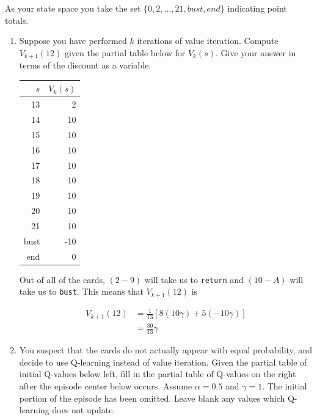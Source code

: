 \documentclass[12pt]{article}
\begin{document}
\noindent
As your state space you take the set $\{0,2,\ldots,21,bust,end\}$
indicating point totals.

\begin{enumerate}

\item Suppose you have performed $k$ iterations of value iteration.
  Compute $V_{k+1}(12)$ given the partial table below for $V_k(s)$.
  Give your answer in terms of the discount as a variable.

\begin{center}
\begin{tabular}{|r|r|} \hline
$s$  & $V_k(s)$\\ \hline
13   &   2     \\
14   &  10     \\
15   &  10     \\
16   &  10     \\
17   &  10     \\
18   &  10     \\
19   &  10     \\
20   &  10     \\
21   &  10     \\
bust & -10     \\
end  &  0      \\ \hline
\end{tabular}
\end{center}

Out of all of the cards, $(2-9)$ will take us to {\tt return} and $(10-A)$ will take us to {\tt bust}. This means that $V_{k+1}(12)$ is

\begin{align*}
   V_{k+1}(12) &= \frac{1}{13}\left[8(10\gamma) + 5(-10\gamma) \right]\\
              &= \frac{30}{13}\gamma
\end{align*}

\item You suspect that the cards do not actually appear with equal
  probability, and decide to use Q-learning instead of value
  iteration.  Given the partial table of initial Q-values below left,
  fill in the partial table of Q-values on the right after the episode
  center below occurs.  Assume $\alpha=0.5$ and $\gamma=1$.  The
  initial portion of the episode has been omitted.  Leave blank any
  values which Q-learning does not update.


\end{enumerate}
\end{document}

